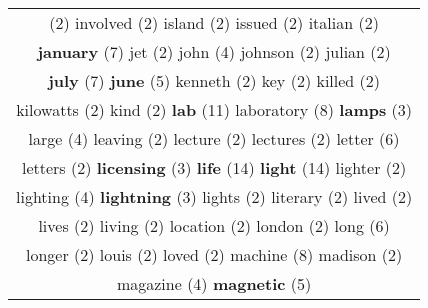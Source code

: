 \documentclass[12pt,a4paper]{article}
\begin{document}
\begin{center}
\begin{longtable}{|c|}
\footnotesize{(2)} {\footnotesize \textcolor{Verde} {involved}} \footnotesize{(2)} {\footnotesize \textcolor{Verde} {island}} \footnotesize{(2)} {\footnotesize \textcolor{Verde} {issued}} \footnotesize{(2)} {\footnotesize \textcolor{Verde} {italian}} \footnotesize{(2)}  \\ {\LARGE \textcolor{Rosa} {\bf january}} \footnotesize{(7)} {\footnotesize \textcolor{Verde} {jet}} \footnotesize{(2)} {\normalsize \textcolor{VerdeLocao} {john}} \footnotesize{(4)} {\footnotesize \textcolor{Verde} {johnson}} \footnotesize{(2)} {\footnotesize \textcolor{Verde} {julian}} \footnotesize{(2)}  \\ {\LARGE \textcolor{Rosa} {\bf july}} \footnotesize{(7)} {\large \textcolor{Roxo} {\bf june}} \footnotesize{(5)} {\footnotesize \textcolor{Verde} {kenneth}} \footnotesize{(2)} {\footnotesize \textcolor{Verde} {key}} \footnotesize{(2)} {\footnotesize \textcolor{Verde} {killed}} \footnotesize{(2)}  \\ {\footnotesize \textcolor{Verde} {kilowatts}} \footnotesize{(2)} {\footnotesize \textcolor{Verde} {kind}} \footnotesize{(2)} {\Huge \textcolor{AzulEscuro} {\bf lab}} \footnotesize{(11)} {\huge \textcolor{Amarelo} {laboratory}} \footnotesize{(8)} {\small \textcolor{Laranja} {\bf lamps}} \footnotesize{(3)}  \\ {\normalsize \textcolor{VerdeLocao} {large}} \footnotesize{(4)} {\footnotesize \textcolor{Verde} {leaving}} \footnotesize{(2)} {\footnotesize \textcolor{Verde} {lecture}} \footnotesize{(2)} {\footnotesize \textcolor{Verde} {lectures}} \footnotesize{(2)} {\Large \textcolor{VermEscuro} {letter}} \footnotesize{(6)}  \\ {\footnotesize \textcolor{Verde} {letters}} \footnotesize{(2)} {\small \textcolor{Laranja} {\bf licensing}} \footnotesize{(3)} {\Huge \textcolor{AzulEscuro} {\bf life}} \footnotesize{(14)} {\Huge \textcolor{AzulEscuro} {\bf light}} \footnotesize{(14)} {\footnotesize \textcolor{Verde} {lighter}} \footnotesize{(2)}  \\ {\normalsize \textcolor{VerdeLocao} {lighting}} \footnotesize{(4)} {\small \textcolor{Laranja} {\bf lightning}} \footnotesize{(3)} {\footnotesize \textcolor{Verde} {lights}} \footnotesize{(2)} {\footnotesize \textcolor{Verde} {literary}} \footnotesize{(2)} {\footnotesize \textcolor{Verde} {lived}} \footnotesize{(2)}  \\ {\footnotesize \textcolor{Verde} {lives}} \footnotesize{(2)} {\footnotesize \textcolor{Verde} {living}} \footnotesize{(2)} {\footnotesize \textcolor{Verde} {location}} \footnotesize{(2)} {\footnotesize \textcolor{Verde} {london}} \footnotesize{(2)} {\Large \textcolor{VermEscuro} {long}} \footnotesize{(6)}  \\ {\footnotesize \textcolor{Verde} {longer}} \footnotesize{(2)} {\footnotesize \textcolor{Verde} {louis}} \footnotesize{(2)} {\footnotesize \textcolor{Verde} {loved}} \footnotesize{(2)} {\huge \textcolor{Amarelo} {machine}} \footnotesize{(8)} {\footnotesize \textcolor{Verde} {madison}} \footnotesize{(2)}  \\ {\normalsize \textcolor{VerdeLocao} {magazine}} \footnotesize{(4)} {\large \textcolor{Roxo} {\bf magnetic}} \footnotesize{(5)} {\small \textcolor{Laranja} {\bf 
\end{longtable}
\end{center}
\end{document}
